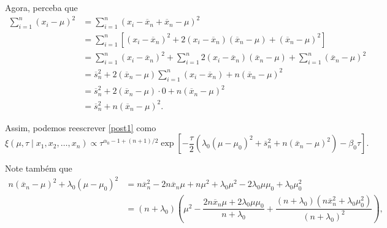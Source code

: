 \documentclass{article}
\begin{document}
Agora, perceba que
\begin{equation*}
    \begin{split}
        \sum_{i = 1}^{n} \left(x_i - \mu\right)^2 & = \sum_{i = 1}^{n} \left(x_i - \overline{x}_n + \overline{x}_n - \mu\right)^2 \\
        & = \sum_{i = 1}^{n} \left[\left(x_i - \overline{x}_n\right)^2 + 2\left(x_i - \overline{x}_n\right)\left(\overline{x}_n - \mu\right) + \left(\overline{x}_n - \mu\right)^2\right] \\
        & = \sum_{i = 1}^{n} \left(x_i - \overline{x}_n\right)^2 + \sum_{i = 1}^{n} 2\left(x_i - \overline{x}_n\right)\left(\overline{x}_n - \mu\right) + \sum_{i = 1}^{n} \left(\overline{x}_n - \mu\right)^2 \\
        & = \overline{s}_n^2 + 2\left(\overline{x}_n - \mu\right)\sum_{i = 1}^{n} \left(x_i - \overline{x}_n\right) + n\left(\overline{x}_n - \mu\right)^2 \\
        & = \overline{s}_n^2 + 2\left(\overline{x}_n - \mu\right)\cdot 0 + n\left(\overline{x}_n - \mu\right)^2 \\
        & = \overline{s}_n^2 + n\left(\overline{x}_n - \mu\right)^2.
    \end{split}
\end{equation*}

Assim, podemos reescrever \ref{post1} como
\begin{equation}
    \label{post2}
    \xi(\mu, \tau \mid x_1, x_2, \dots, x_n) \propto \tau^{\alpha_0 - 1 + (n + 1)/2} \exp{\left[-\dfrac{\tau}{2}\left(\lambda_0 (\mu - \mu_0)^2 + \overline{s}_n^2 + n\left(\overline{x}_n - \mu\right)^2\right) - \beta_0 \tau\right]}.
\end{equation}

Note também que
\begin{equation}
    \label{ig}
    \begin{split}
        n\left(\overline{x}_n - \mu\right)^2 + \lambda_0\left(\mu - \mu_0\right)^2 & = n\overline{x}_n^2 - 2n\overline{x}_n\mu + n\mu^2 + \lambda_0\mu^2 - 2\lambda_0\mu\mu_0 + \lambda_0\mu_0^2 \\
        & = (n + \lambda_0)\left(\mu^2 - \dfrac{2n\overline{x}_n\mu + 2\lambda_0\mu\mu_0}{n + \lambda_0} + \dfrac{\left(n + \lambda_0\right)\left(n\overline{x}_n^2 + \lambda_0\mu_0^2\right)}{\left(n + \lambda_0\right)^2}\right),
    \end{split}
\end{equation}
\end{document}
